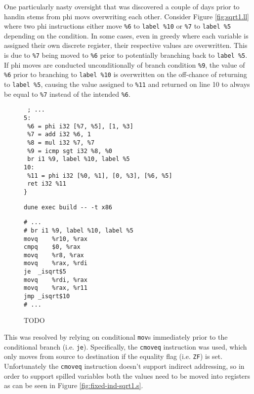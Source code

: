 \documentclass{article}
\begin{document}
One particularly nasty oversight that was discovered a couple of days prior to handin stems from phi movs overwriting each other.
Consider Figure \ref{fig:sqrt1.ll} where two phi instructions either move \texttt{\%6} to \texttt{label \%10} or \texttt{\%7} to \texttt{label \%5} depending on the condition. In some cases, even in greedy where each variable is assigned their own discrete register, their respective values are overwritten. This is due to \texttt{\%7} being moved to \texttt{\%6} prior to potentially branching back to \texttt{label \%5}. If phi moves are conducted unconditionally of branch condition \texttt{\%9}, the value of \texttt{\%6} prior to branching to \texttt{label \%10} is overwritten on the off-chance of returning to \texttt{label \%5}, causing the value assigned to \texttt{\%11} and returned on line 10 to always be equal to \texttt{\%7}   instead of the intended  \texttt{\%6}.


\begin{figure}[H]
   \begin{minipage}{0.58\textwidth}
     \centering
     \begin{verbatim}
 ; ...
5:
 %6 = phi i32 [%7, %5], [1, %3]
 %7 = add i32 %6, 1
 %8 = mul i32 %7, %7
 %9 = icmp sgt i32 %8, %0
 br i1 %9, label %10, label %5
10:
 %11 = phi i32 [%0, %1], [0, %3], [%6, %5]
 ret i32 %11
}
     \end{verbatim}
     \caption{\texttt{dune exec build -{}- -t x86}}\label{fig:sqrt1.ll}
   \end{minipage}
   \begin{minipage}{0.40\textwidth}
     \centering
     \begin{verbatim}
# ...
# br i1 %9, label %10, label %5
movq	%r10, %rax
cmpq	$0, %rax
movq	%r8, %rax
movq	%rax, %rdi
je	_isqrt$5
movq	%rdi, %rax
movq	%rax, %r11
jmp	_isqrt$10
# ...
     \end{verbatim}
     \caption{TODO}\label{fig:sqrt1.s}
   \end{minipage}
\end{figure}

\noindent This was resolved by relying on conditional \texttt{mov}s immediately prior to the conditional branch (i.e. \texttt{je}). Specifically, the \texttt{cmoveq} instruction was used, which only moves from source to destination if the equality flag (i.e. \texttt{ZF}) is set.
Unfortunately the \texttt{cmoveq} instruction doesn't support indirect addressing, so in order to support spilled variables both the values need to be moved into registers as can be seen in Figure \ref{fig:fixed-ind-sqrt1.s}.
\end{document}
